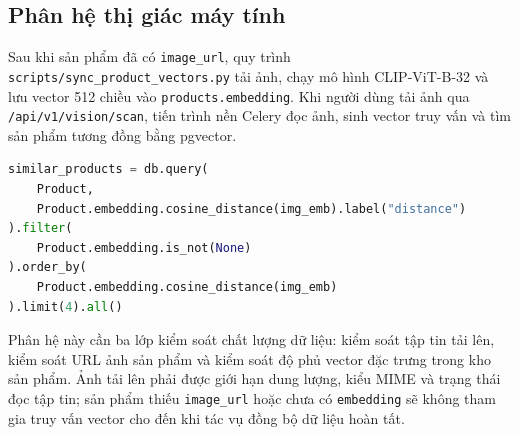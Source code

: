 \documentclass[12pt, a4paper]{article}
\begin{document}
\subsection{Phân hệ thị giác máy tính}
Sau khi sản phẩm đã có \texttt{image\_url}, quy trình \texttt{scripts/sync\_product\_vectors.py} tải ảnh, chạy mô hình CLIP-ViT-B-32 và lưu vector 512 chiều vào \texttt{products.embedding}. Khi người dùng tải ảnh qua \texttt{/api/v1/vision/scan}, tiến trình nền Celery đọc ảnh, sinh vector truy vấn và tìm sản phẩm tương đồng bằng pgvector.

\begin{lstlisting}[language=Python, caption={Truy vấn sản phẩm tương đồng trong tiến trình Celery}]
similar_products = db.query(
    Product,
    Product.embedding.cosine_distance(img_emb).label("distance")
).filter(
    Product.embedding.is_not(None)
).order_by(
    Product.embedding.cosine_distance(img_emb)
).limit(4).all()
\end{lstlisting}

Phân hệ này cần ba lớp kiểm soát chất lượng dữ liệu: kiểm soát tập tin tải lên, kiểm soát URL ảnh sản phẩm và kiểm soát độ phủ vector đặc trưng trong kho sản phẩm. Ảnh tải lên phải được giới hạn dung lượng, kiểu MIME và trạng thái đọc tập tin; sản phẩm thiếu \texttt{image\_url} hoặc chưa có \texttt{embedding} sẽ không tham gia truy vấn vector cho đến khi tác vụ đồng bộ dữ liệu hoàn tất.
\end{document}
